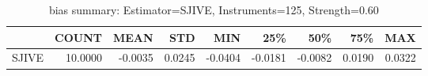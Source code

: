\begin{table}[ht]
\centering
\caption{bias summary: Estimator=SJIVE, Instruments=125, Strength=0.60}
\begin{tabular}{lrrrrrrrr}
\toprule
 & COUNT & MEAN & STD & MIN & 25\% & 50\% & 75\% & MAX \\
\midrule
SJIVE & 10.0000 & -0.0035 & 0.0245 & -0.0404 & -0.0181 & -0.0082 & 0.0190 & 0.0322 \\
\bottomrule
\end{tabular}
\end{table}
